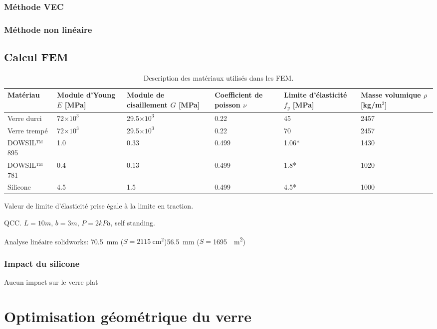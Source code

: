 \documentclass[11pt,titlepage]{article}
\begin{document}
\subsubsection{Méthode VEC}
\subsubsection{Méthode non linéaire}

\subsection{Calcul FEM}\label{sec:temoin}
\begin{table}[H]
\begin{center}
\caption{Description des matériaux utilisés dans les \acrshort{FEM}.}
\label{tab:mat_autoportant}
\begin{tabularx}{\textwidth}{l*{5}{Y}}
\toprule
\textbf{Matériau} & \textbf{Module d'Young} $E$ [MPa] & \textbf{Module de cisaillement} $G$ [MPa]&\textbf{Coefficient de poisson} $\nu$ & \textbf{Limite d'élasticité} $f_y$ [MPa]& \textbf{Masse volumique} $\rho$ [kg/m$^3$] \\\midrule
Verre durci & 72$\times 10^3$ & 29.5$\times 10^3$ & 0.22 &45 & 2457 \\
Verre trempé & 72$\times 10^3$ & 29.5$\times 10^3$ & 0.22 &70 & 2457 \\
DOWSIL™ 895 & 1.0 & 0.33 & 0.499 & 1.06* & 1430 \\
DOWSIL™ 781 & 0.4 & 0.13 & 0.499 & 1.8* & 1020 \\
Silicone & 4.5 & 1.5 & 0.499 & 4.5* & 1000\\
\bottomrule
\end{tabularx}
\end{center}
{\RaggedLeft \footnotesize * Valeur de limite d'élasticité prise égale à la limite en traction.}\end{table}
QCC. $L=10m$, $b=3m$, $P=2kPa$, self standing.

Analyse linéaire solidworks: \qty{70.5}{\milli\meter} ($S= \qty{2115}{\centi\square\meter}$)\qty{56.5}{\milli\meter} ($S=$\SI{1695}{\centi\square\meter})

\subsubsection{Impact du silicone}
Aucun impact sur le verre plat

\newpage

\section{Optimisation géométrique du verre}
\end{document}

